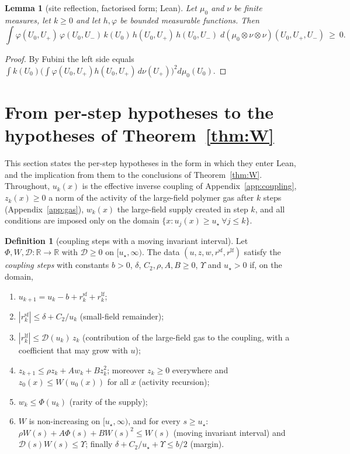 \documentclass[11pt,a4paper]{article}
\newtheorem{lemma}[theorem]{Lemma}
\theoremstyle{definition}
\newtheorem{definition}[theorem]{Definition}
\theoremstyle{remark}
\begin{document}
\begin{lemma}[site reflection, factorised form; Lean]\label{lem:site}
Let $\mu_0$ and $\nu$ be finite measures, let $k\ge0$ and let $h,\varphi$ be bounded measurable functions. Then
\[\int\varphi(U_0,U_+)\,\varphi(U_0,U_-)\,k(U_0)\,h(U_0,U_+)\,h(U_0,U_-)\;d(\mu_0\otimes\nu\otimes\nu)(U_0,U_+,U_-)\ \ge\ 0 .\]
\end{lemma}
\begin{proof}
By Fubini the left side equals $\int k(U_0)\bigl(\int\varphi(U_0,U_+)h(U_0,U_+)\,d\nu(U_+)\bigr)^2d\mu_0(U_0)$.
\end{proof}

\section{From per-step hypotheses to the hypotheses of Theorem~\ref{thm:W}}\label{sec:chain}

This section states the per-step hypotheses in the form in which they enter Lean, and the implication from them to the conclusions of Theorem~\ref{thm:W}. Throughout, $u_k(x)$ is the effective inverse coupling of Appendix~\ref{app:coupling}, $z_k(x)\ge0$ a norm of the activity of the large-field polymer gas after $k$ steps (Appendix~\ref{app:gas}), $w_k(x)$ the large-field supply created in step $k$, and all conditions are imposed only on the domain $\{x:u_j(x)\ge u_\star\ \forall j\le k\}$.

\begin{definition}[coupling steps with a moving invariant interval]\label{def:steps}
Let $\Phi,W,\mathcal D\colon\mathbb R\to\mathbb R$ with $\mathcal D\ge0$ on $[u_\star,\infty)$. The data $(u,z,w,r^{\mathrm{sf}},r^{\mathrm{lf}})$ satisfy the \emph{coupling steps} with constants $b>0$, $\delta$, $C_2,\rho,A,B\ge0$, $\Upsilon$ and $u_\star>0$ if, on the domain,
\begin{enumerate}[label=(S\arabic*),leftmargin=3em]
\item $u_{k+1}=u_k-b+r^{\mathrm{sf}}_k+r^{\mathrm{lf}}_k$;
\item $|r^{\mathrm{sf}}_k|\le\delta+C_2/u_k$ (small-field remainder);
\item $|r^{\mathrm{lf}}_k|\le\mathcal D(u_k)\,z_k$ (contribution of the large-field gas to the coupling, with a coefficient that may grow with $u$);
\item $z_{k+1}\le\rho z_k+A w_k+B z_k^2$; moreover $z_k\ge0$ everywhere and $z_0(x)\le W(u_0(x))$ for all $x$ (activity recursion);
\item $w_k\le\Phi(u_k)$ (rarity of the supply);
\item $W$ is non-increasing on $[u_\star,\infty)$, and for every $s\ge u_\star$: $\rho W(s)+A\Phi(s)+BW(s)^2\le W(s)$ (moving invariant interval) and $\mathcal D(s)W(s)\le\Upsilon$; finally $\delta+C_2/u_\star+\Upsilon\le b/2$ (margin).
\end{enumerate}
\end{definition}
\end{document}
